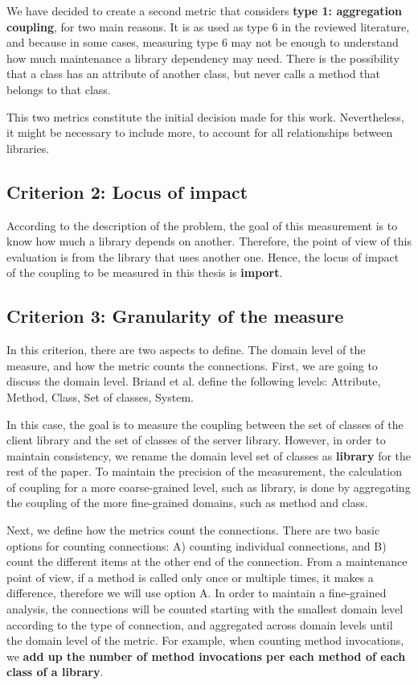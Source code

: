 \documentclass[a4paper]{article}
\begin{document}
We have decided to create a second metric that considers \textbf{type 1: aggregation coupling}, for two main reasons. It is as used as type 6 in the reviewed literature, and because in some cases, measuring type 6 may not be enough to understand how much maintenance a library dependency may need. There is the possibility that a class has an attribute of another class, but never calls a method that belongs to that class.

This two metrics constitute the initial decision made for this work. Nevertheless, it might be necessary to include more, to account for all relationships between libraries.

\subsection{Criterion 2: Locus of impact}
According to the description of the problem, the goal of this measurement is to know how much a library depends on another. Therefore, the point of view of this evaluation is from the library that uses another one. Hence, the locus of impact of the coupling to be measured in this thesis is \textbf{import}.

\subsection{Criterion 3: Granularity of the measure}
In this criterion, there are two aspects to define. The domain level of the measure, and how the metric counts the connections. First, we are going to discuss the domain level. Briand et al. define the following levels: Attribute, Method, Class, Set of classes, System.

In this case, the goal is to measure the coupling between the set of classes of the client library and the set of classes of the server library. However, in order to maintain consistency, we rename the domain level set of classes as \textbf{library} for the rest of the paper. To maintain the precision of the measurement, the calculation of coupling for a more coarse-grained level, such as library, is done by aggregating the coupling of the more fine-grained domains, such as method and class.

Next, we define how the metrics count the connections. There are two basic options for counting connections: A) counting individual connections, and B) count the different items at the other end of the connection. From a maintenance point of view, if a method is called only once or multiple times, it makes a difference, therefore we will use option A. In order to maintain a fine-grained analysis, the connections will be counted starting with the smallest domain level according to the type of connection, and aggregated across domain levels until the domain level of the metric. For example, when counting method invocations, we  \textbf{add up the number of method invocations per each method of each class of a library}.
\end{document}
